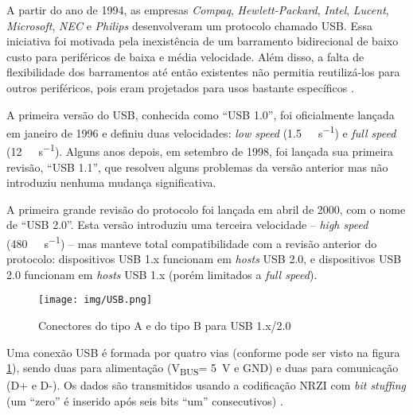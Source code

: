 \documentclass[brazil,pagestart=firstchapter]{abnt}
\newcommand*{\VBUS}{V\textsubscript{BUS}\xspace}
\newcommand*{\GND}{GND\xspace}
\begin{document}

A partir do ano de 1994, as empresas \textit{Compaq},
\textit{Hewlett-Packard}, \textit{Intel}, \textit{Lucent},
\textit{Microsoft}, \textit{NEC} e \textit{Philips} desenvolveram um
protocolo chamado \acf{USB}. Essa iniciativa foi motivada pela inexistência
de um barramento bidirecional de baixo custo para periféricos de baixa e
média velocidade. Além disso, a falta de flexibilidade dos barramentos até
então existentes não permitia reutilizá-los para outros periféricos, pois
eram projetados para usos bastante específicos \cite{usb20}.

A primeira versão do \ac{USB}, conhecida como ``USB 1.0'', foi oficialmente
lançada em janeiro de 1996 e definiu duas velocidades: \textit{low speed}
(\SI{1.5}{\mega\bit\per\second}) e \textit{full speed}
(\SI{12}{\mega\bit\per\second}). Alguns anos depois, em setembro de 1998, foi
lançada sua primeira revisão, ``USB 1.1'', que resolveu alguns problemas da
versão anterior mas não introduziu nenhuma mudança significativa.

A primeira grande revisão do protocolo foi lançada em abril de 2000, com o
nome de ``USB 2.0''. Esta versão introduziu uma terceira velocidade --
\textit{high speed} (\SI{480}{\mega\bit\per\second}) -- mas manteve total
compatibilidade com a revisão anterior do protocolo: dispositivos USB 1.x
funcionam em \textit{hosts} USB 2.0, e dispositivos USB 2.0 funcionam em
\textit{hosts} USB 1.x (porém limitados a \textit{full speed}).

\begin{figure}[h]
\centering
\texttt{[image: img/USB.png]}
\caption{Conectores do tipo A e do tipo B para USB 1.x/2.0}
\label{fig:usb_connectors}
\end{figure}

Uma conexão \ac{USB} é formada por quatro vias (conforme pode ser visto na
figura \ref{fig:usb_connectors}), sendo duas para alimentação (\VBUS =
\SI{+5}{\volt} e \GND) e duas para comunicação (D+ e D-). Os dados são
transmitidos usando a codificação \ac{NRZI} com \textit{bit stuffing} (um
``zero'' é inserido após seis bits ``um'' consecutivos)
\cite{usb20} \cite{usbinanutshell}.
\end{document}
